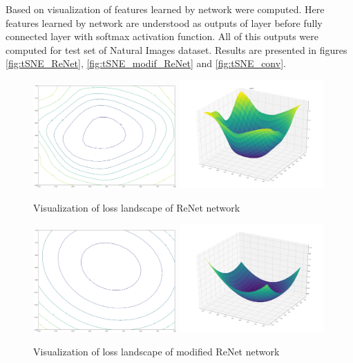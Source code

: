 \documentclass[a4paper, 10 pt, journal]{ieeeconf}
\begin{document}
Based on \cite{tSNE} visualization of features learned by network were computed. Here features learned by network are understood as outputs of layer before fully connected layer with softmax activation function. All of this outputs were computed for test set of Natural Images dataset. Results are presented in figures \ref{fig:tSNE_ReNet}, \ref{fig:tSNE_modif_ReNet} and \ref{fig:tSNE_conv}.

\begin{figure}
\centering
	\includegraphics[width=0.49\textwidth]{img/loss_ReNet.png}
	\includegraphics[width=0.49\textwidth]{img/loss_3d_ReNet.png}
	\caption{Visualization of loss landscape of ReNet network}
	\label{fig:loss_ReNet}
\end{figure}

\begin{figure}
\centering
	\includegraphics[width=0.49\textwidth]{img/loss_modif_ReNet.png}
	\includegraphics[width=0.49\textwidth]{img/loss_3d_modif_ReNet.png}
	\caption{Visualization of loss landscape of modified ReNet network}
	\label{fig:loss_modif_ReNet}
\end{figure}
\end{document}
